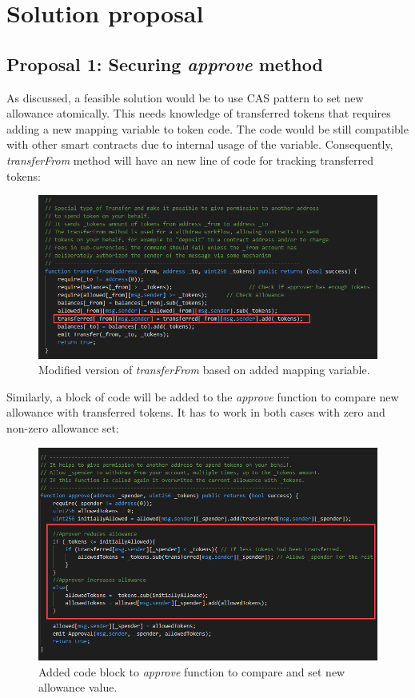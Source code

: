 \section{Solution proposal}
\subsection{Proposal 1: Securing \textit{approve} method}
As discussed, a feasible solution would be to use CAS pattern to set new allowance atomically. This needs knowledge of transferred tokens that requires adding a new mapping variable to token code. The code would be still compatible with other smart contracts due to internal usage of the variable. Consequently, \textit{transferFrom} method will have an new line of code for tracking transferred tokens:
\begin{figure}[H]
	\centering
	\includegraphics[width=1.0\linewidth]{figures/multiple_withdrawal_14.png}
	\caption{Modified version of \textit{transferFrom} based on added mapping variable.}
\end{figure}
\noindent Similarly, a block of code will be added to the \textit{approve} function to compare new allowance with transferred tokens. It has to work in both cases with zero and non-zero allowance set:
\begin{figure}[H]
	\centering
	\includegraphics[width=1.0\linewidth]{figures/multiple_withdrawal_15.png}
	\caption{Added code block to \textit{approve} function to compare and set new allowance value.}
\end{figure}
